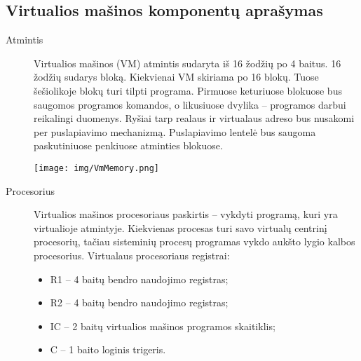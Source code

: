 \subsection{Virtualios mašinos komponentų aprašymas}
\begin{description}
\item[Atmintis] \leavevmode 

Virtualios mašinos (VM) atmintis sudaryta iš 16 žodžių po 4 baitus. 16 žodžių sudarys bloką. Kiekvienai VM skiriama po 16 blokų. Tuose šešiolikoje blokų turi tilpti programa.
Pirmuose keturiuose blokuose bus saugomos programos komandos, o likusiuose dvylika – programos darbui reikalingi duomenys.
Ryšiai tarp realaus ir virtualaus adreso bus nusakomi per puslapiavimo mechanizmą. Puslapiavimo lentelė bus saugoma paskutiniuose penkiuose atminties blokuose.

\texttt{[image: img/VmMemory.png]}

\item[Procesorius]  \leavevmode 
  
Virtualios mašinos procesoriaus paskirtis – vykdyti programą, kuri yra virtualioje atmintyje. Kiekvienas procesas turi savo virtualų centrinį procesorių, tačiau sisteminių procesų programas vykdo aukšto lygio kalbos procesorius. 
Virtualaus procesoriaus registrai:
\begin{itemize}
\item R1 – 4 baitų bendro naudojimo registras;
\item R2 – 4 baitų bendro naudojimo registras;
\item IC – 2 baitų virtualios mašinos programos skaitiklis;
\item C – 1 baito loginis trigeris.
\end{itemize}


\end{description}
